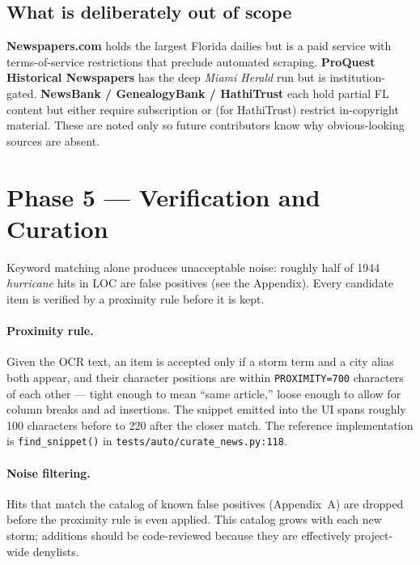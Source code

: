 \documentclass[11pt,letterpaper]{article}
\begin{document}
\subsection{What is deliberately out of scope}
\textbf{Newspapers.com} holds the largest Florida dailies but is a paid service with terms-of-service restrictions that preclude automated scraping. \textbf{ProQuest Historical Newspapers} has the deep \emph{Miami Herald} run but is institution-gated. \textbf{NewsBank / GenealogyBank / HathiTrust} each hold partial FL content but either require subscription or (for HathiTrust) restrict in-copyright material. These are noted only so future contributors know why obvious-looking sources are absent.

\section{Phase 5 --- Verification and Curation}

Keyword matching alone produces unacceptable noise: roughly half of 1944 \emph{hurricane} hits in LOC are false positives (see the Appendix). Every candidate item is verified by a proximity rule before it is kept.

\paragraph{Proximity rule.} Given the OCR text, an item is accepted only if a storm term and a city alias both appear, and their character positions are within \texttt{PROXIMITY=700} characters of each other --- tight enough to mean ``same article,'' loose enough to allow for column breaks and ad insertions. The snippet emitted into the UI spans roughly 100 characters before to 220 after the closer match. The reference implementation is \texttt{find\_snippet()} in \texttt{tests/auto/curate\_news.py:118}.

\paragraph{Noise filtering.} Hits that match the catalog of known false positives (Appendix~A) are dropped before the proximity rule is even applied. This catalog grows with each new storm; additions should be code-reviewed because they are effectively project-wide denylists.
\end{document}
